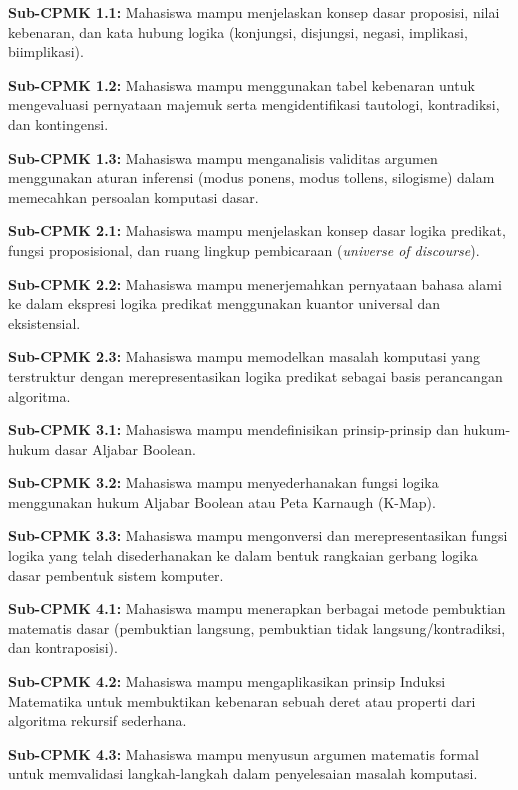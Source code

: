 \documentclass[../main]{subfiles}
\begin{document}
\begin{subcpmk}
  \item \textbf{Sub-CPMK 1.1:} Mahasiswa mampu menjelaskan konsep dasar proposisi, nilai kebenaran, dan kata hubung logika (konjungsi, disjungsi, negasi, implikasi, biimplikasi).
  \item \textbf{Sub-CPMK 1.2:} Mahasiswa mampu menggunakan tabel kebenaran untuk mengevaluasi pernyataan majemuk serta mengidentifikasi tautologi, kontradiksi, dan kontingensi.
  \item \textbf{Sub-CPMK 1.3:} Mahasiswa mampu menganalisis validitas argumen menggunakan aturan inferensi (modus ponens, modus tollens, silogisme) dalam memecahkan persoalan komputasi dasar.
  \item \textbf{Sub-CPMK 2.1:} Mahasiswa mampu menjelaskan konsep dasar logika predikat, fungsi proposisional, dan ruang lingkup pembicaraan (\textit{universe of discourse}).
  \item \textbf{Sub-CPMK 2.2:} Mahasiswa mampu menerjemahkan pernyataan bahasa alami ke dalam ekspresi logika predikat menggunakan kuantor universal dan eksistensial.
  \item \textbf{Sub-CPMK 2.3:} Mahasiswa mampu memodelkan masalah komputasi yang terstruktur dengan merepresentasikan logika predikat sebagai basis perancangan algoritma.
  \item \textbf{Sub-CPMK 3.1:} Mahasiswa mampu mendefinisikan prinsip-prinsip dan hukum-hukum dasar Aljabar Boolean.
  \item \textbf{Sub-CPMK 3.2:} Mahasiswa mampu menyederhanakan fungsi logika menggunakan hukum Aljabar Boolean atau Peta Karnaugh (K-Map).
  \item \textbf{Sub-CPMK 3.3:} Mahasiswa mampu mengonversi dan merepresentasikan fungsi logika yang telah disederhanakan ke dalam bentuk rangkaian gerbang logika dasar pembentuk sistem komputer.
  \item \textbf{Sub-CPMK 4.1:} Mahasiswa mampu menerapkan berbagai metode pembuktian matematis dasar (pembuktian langsung, pembuktian tidak langsung/kontradiksi, dan kontraposisi).
  \item \textbf{Sub-CPMK 4.2:} Mahasiswa mampu mengaplikasikan prinsip Induksi Matematika untuk membuktikan kebenaran sebuah deret atau properti dari algoritma rekursif sederhana.
  \item \textbf{Sub-CPMK 4.3:} Mahasiswa mampu menyusun argumen matematis formal untuk memvalidasi langkah-langkah dalam penyelesaian masalah komputasi.
\end{subcpmk}
\end{document}

